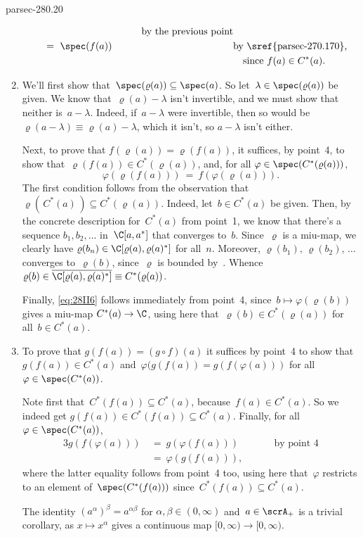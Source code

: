 \documentclass[b5page]{book}
\begin{document}
\begin{solution}{parsec-280.20}
\begin{enumerate}
\begin{alignat*}{3}
\qquad&&\text{by the previous point} \\
\ &=\ 
\spec(f(a))\qquad&&\text{by~\sref{parsec-270.170},}
\\
&&&\quad\text{since~$f(a)\in C^*(a)$}.
\end{alignat*}
\item
We'll first show that~$\spec(\varrho(a))\subseteq \spec(a)$.
So let~$\lambda\in \spec(\varrho(a))$ be given.
We know that~$\varrho(a)-\lambda$
isn't invertible,
and we must show that neither is~$a-\lambda$.
Indeed,
if~$a-\lambda$ were invertible,
then so would be $\varrho(a-\lambda)\equiv \varrho(a)-\lambda$,
which it isn't,
so $a-\lambda$ isn't either.

Next,
to prove that $f(\varrho(a))=\varrho(f(a))$,
it suffices, by point~4,
to show that~$\varrho(f(a))\in C^*(\varrho(a))$,
and,
for all
$\varphi\in\spec(C^*(\varrho(a)))$,
\begin{equation}
\label{eq:28II6}
\varphi(\varrho(f(a)))
\ =\ f(\varphi(\varrho(a))).
\end{equation}
The first condition
follows from the observation
that~$\varrho(\,C^*(a)\,)\subseteq C^*(\varrho(a))$.
Indeed,
let~$b\in C^*(a)$ be given.
Then, by the concrete description
for~$C^*(a)$ from point~1, we know that there's a sequence
$b_1,b_2,\dotsc$ in~$\C[a,a^*]$
that converges to~$b$.
Since~$\varrho$ is a miu-map,
we clearly have $\varrho(b_n)\in \C[\varrho(a),\varrho(a)^*]$
for all~$n$.
Moreover, $\varrho(b_1),\,\varrho(b_2),\,\dotsc$
converges to~$\varrho(b)$,
since~$\varrho$ is bounded
by~.
Whence~$\varrho(b)\in \overline{\C[\varrho(a),\varrho(a)^*]}
\equiv C^*(\varrho(a))$.

Finally,
\eqref{eq:28II6}
follows immediately from point~4,
since~$b\mapsto \varphi(\varrho(b))$
gives a miu-map $C^*(a)\to \C$,
using here that~$\varrho(b)\in C^*(\varrho(a))$
for all~$b\in C^*(a)$.
\item 
To prove that $g(f(a))=(g\circ f)(a)$
it suffices by point~4
to show that $g(f(a))\in C^*(a)$
and~$\varphi(g(f(a))=g(f(\varphi(a)))$
for all $\varphi\in\spec(C^*(a))$.

Note first that~$C^*(f(a))\subseteq C^*(a)$,
because~$f(a)\in C^*(a)$.
So we  indeed get $g(f(a))\in C^*(f(a))\subseteq C^*(a)$.
Finally,
for all~$\varphi\in \spec(C^*(a))$,
\begin{alignat*}{3}
g(f(\varphi(a)))
\ &=\ 
g(\varphi(f(a)))\qquad
&&\text{by point~4} \\
\ &=\ 
\varphi(g(f(a))),
\end{alignat*}
where the latter equality
follows from point~4 too,
using here that~$\varphi$
restricts to an element of~$\spec(C^*(f(a)))$
since~$C^*(f(a))\subseteq C^*(a)$.

The identity $(a^\alpha)^\beta = a^{\alpha\beta}$
for $\alpha,\beta\in(0,\infty)$
and~$a\in\scrA_+$
is a trivial corollary,
as $x\mapsto x^\alpha$
gives a continuous map $[0,\infty)\to [0,\infty)$.
\end{enumerate}
\end{solution}
\end{document}
